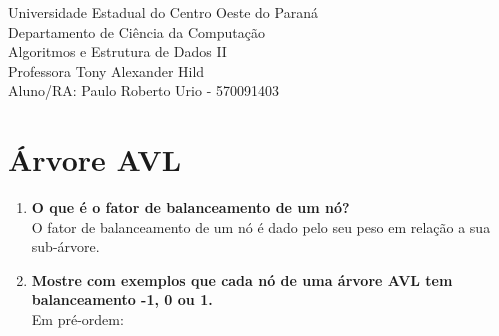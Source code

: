 \documentclass[12pt]{article}
\newcommand{\itembf}[1]{ \item{ \textbf{#1} }  \\ }
\begin{document}
\begin{center}
Universidade Estadual do Centro Oeste do Paraná \\
Departamento de Ciência da Computação \\
Algoritmos e Estrutura de Dados II \\
Professora Tony Alexander Hild \\
Aluno/RA: Paulo Roberto Urio - 570091403
\end{center}

\section{Árvore AVL}

\begin{enumerate}

\itembf{O que é o fator de balanceamento de um nó?}
	O fator de balanceamento de um nó é dado pelo seu peso em 
	relação a sua sub-árvore.

\itembf{Mostre com exemplos que cada nó de uma árvore AVL tem 
	balanceamento -1, 0 ou 1.}
	Em pré-ordem:
	\begin{figure}[ht]


	\end{figure}


\end{enumerate}
\end{document}
